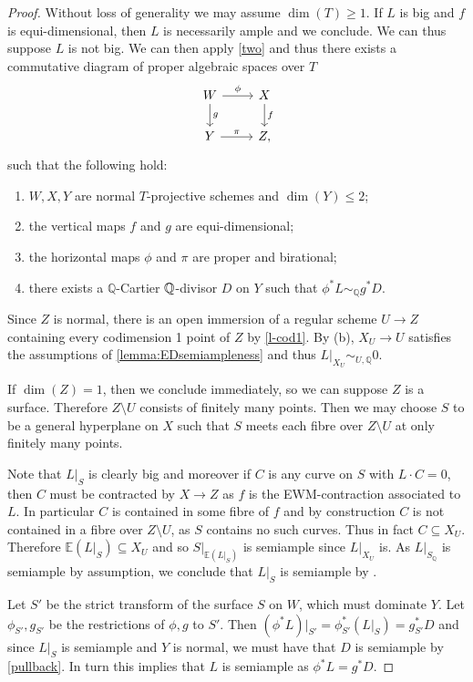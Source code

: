 \begin{proof}
	Without loss of generality we may assume $\dim(T)\geq 1$. If $L$ is big and $f$ is equi-dimensional, then $L$ is necessarily ample and we conclude.
	We can thus suppose $L$ is not big. We can then apply \autoref{two} and thus there exists a commutative diagram of proper algebraic spaces over $T$
	\[\begin{tikzcd}
	W \arrow[d, "g"] \arrow[r, "\phi"] & X \arrow[d, "f"] \\
	Y \arrow[r, "\pi"]             & Z  ,                
	\end{tikzcd}\]	
	such that the following hold:
	
	\begin{enumerate}
		\item $W,X,Y$ are normal $T$-projective schemes and $\dim (Y) \leq 2$;
		\item the vertical maps $f$ and $g$ are equi-dimensional;
		\item the horizontal maps $\phi$ and $\pi$ are proper and birational;
		\item there exists a $\mathbb{Q}$-Cartier $\mathbb{Q}$-divisor $D$ on $Y$ such that $\phi^{*}L \sim_{\mathbb{Q}} g^{*}D$.
	\end{enumerate}
	Since $Z$ is normal, there is an open immersion of a regular scheme $U \to Z$ containing every codimension 1 point of $Z$ by \autoref{l-cod1}.
	By (b), $X_{U} \to U$ satisfies the assumptions of \autoref{lemma:EDsemiampleness} and thus $L|_{X_{U}} \sim_{U,\mathbb{Q}} 0$. 
	
	If $\dim(Z)=1$, then we conclude immediately, so we can suppose $Z$ is a surface. Therefore $Z \setminus U$ consists of finitely many points.  
	Then we may choose $S$ to be a general hyperplane on $X$ such that $S$ meets each fibre over $Z \setminus U$ at only finitely many points. 
	
	Note that $L|_{S}$ is clearly big and moreover if $C$ is any curve on $S$ with $L \cdot C =0$, then $C$ must be contracted by $X \to Z$ as $f$ is the EWM-contraction associated to $L$. In particular $C$ is contained in some fibre of $f$ and by construction $C$ is not contained in a fibre over $Z \setminus U$, as $S$ contains no such curves. Thus in fact $C \subseteq X_{U}$. Therefore $\mathbb{E}(L|_{S}) \subseteq X_{U}$ and so $S|_{\mathbb{E}(L|_{S})}$ is semiample since $L|_{X_{U}}$ is. As $L|_{S_{\mathbb{Q}}}$ is semiample by assumption, we conclude that $L|_{S}$ is semiample by \cite[Theorem 6.1]{witaszek2020keels}. 
	
	Let $S'$ be the strict transform of the surface $S$ on $W$, which must dominate $Y$. Let $\phi_{S'}, g_{S'}$ be the restrictions of $\phi, g$ to $S'$. Then $(\phi^{*}L)|_{S'}=\phi_{S'}^{*}(L|_{S})=g_{S'}^{*}D$ and since $L|_{S}$ is semiample and $Y$ is normal, we must have that $D$ is semiample by \autoref{pullback}. In turn this implies that $L$ is semiample as $\phi^{*}L=g^{*}D$.	
\end{proof}	

